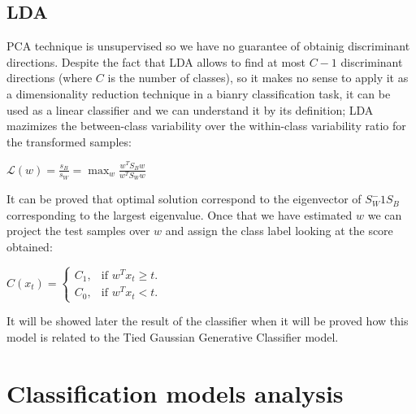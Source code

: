\documentclass[10pt, a4paper, twocolumn]{article} %
\begin{document}
\subsection{LDA}
PCA technique is unsupervised so we have no guarantee of obtainig discriminant directions.
Despite the fact that LDA allows to find at most $C - 1$ discriminant directions (where $C$ is the number of classes), so 
it makes no sense to apply it as a dimensionality reduction technique in a bianry classification task, it can
be used as a linear classifier and we can understand it by its definition; LDA mazimizes the
between-class variability over the within-class variability ratio for the transformed samples:
\begin{center}
	\begin{math}
		\mathcal{L}(w) = \frac{s_{B}}{s_{W}} = \max_w \frac{w^TS_{B}w}{w^TS_{W}w}
	\end{math}
\end{center}
It can be proved that optimal solution correspond to the eigenvector of $S_{W}^-1S_{B}$ 
corresponding to the largest eigenvalue. Once that we have estimated $w$ we can project
the test samples over $w$ and assign the class label looking at the score obtained:\\
\begin{center}
	\begin{math}
		C(x_t)=\left\{
		\begin{array}{ll}
			C_1, & \mbox{if $w^Tx_t \ge t$}.\\
			C_0, & \mbox{if $w^Tx_t < t$}.
		\end{array}
		\right.
	\end{math}
\end{center}
It will be showed later the result of the classifier when it will be proved how this model
is related to the Tied Gaussian Generative Classifier model.
\section{Classification models analysis}
\end{document}
